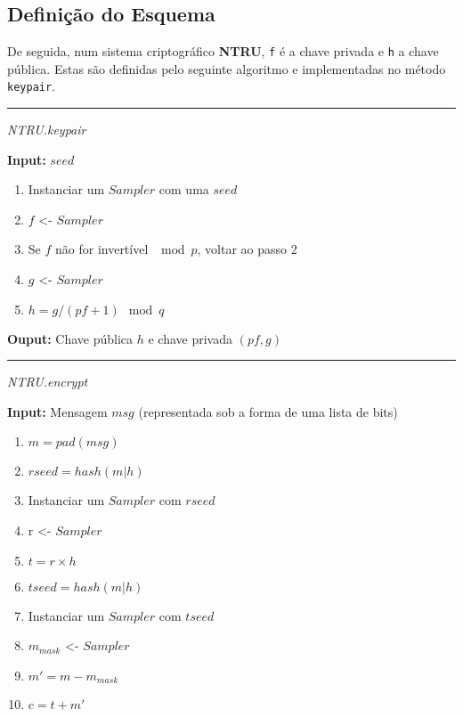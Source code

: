 \documentclass[11pt]{article}
\providecommand{\tightlist}{%
      \setlength{\itemsep}{0pt}\setlength{\parskip}{0pt}}
\begin{document}
    \hypertarget{definiuxe7uxe3o-do-esquema}{%
\subsection{Definição do Esquema}\label{definiuxe7uxe3o-do-esquema}}

    De seguida, num sistema criptográfico \textbf{NTRU}, \texttt{f} é a
chave privada e \texttt{h} a chave pública. Estas são definidas pelo
seguinte algoritmo e implementadas no método \texttt{keypair}.

\begin{center}\rule{0.5\linewidth}{\linethickness}\end{center}

\emph{NTRU.keypair}

\textbf{Input:} $seed$

\begin{enumerate}
\tightlist
\item
  Instanciar um $Sampler$ com uma $seed$
\item
  $f$ <- $Sampler$
\item
  Se $f$ não for invertível $\mod p$, voltar ao passo 2
\item
  $g$ <- $Sampler$
\item
  $h = g / (pf + 1) \mod q$
\end{enumerate}

\textbf{Ouput:} Chave pública $h$ e chave privada $(𝑝𝑓,𝑔)$

\begin{center}\rule{0.5\linewidth}{\linethickness}\end{center}

\emph{NTRU.encrypt}

\textbf{Input:} Mensagem \(msg\) (representada sob a forma de uma lista
de bits)

\begin{enumerate}
\def\labelenumi{\arabic{enumi}.}
\tightlist
\item
  \(m = pad(msg)\)
\item
  \(rseed = hash(m|h)\)
\item
  Instanciar um \(Sampler\) com \(rseed\)
\item
  r \textless- \(Sampler\)
\item
  \(t = r \times h\)
\item
  \(tseed = hash(m|h)\)
\item
  Instanciar um \(Sampler\) com \(tseed\)
\item
  \(m_{mask}\) \textless- \(Sampler\)
\item
  \(m' = m - m_{mask}\)
\item
  \(c = t + m'\)
\end{enumerate}
\end{document}
